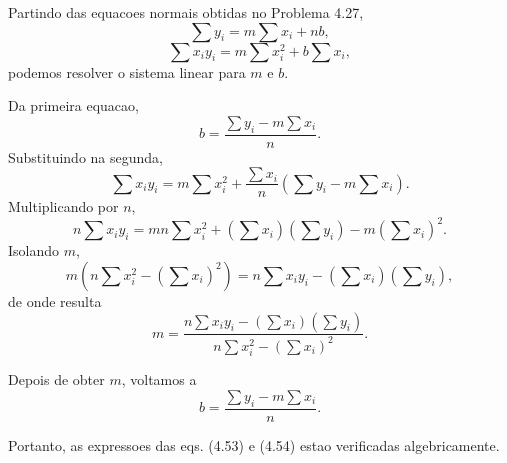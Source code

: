 Partindo das equacoes normais obtidas no Problema 4.27,
\[
\sum y_i=m\sum x_i+nb,
\]
\[
\sum x_i y_i=m\sum x_i^2+b\sum x_i,
\]
podemos resolver o sistema linear para $m$ e $b$.

Da primeira equacao,
\[
b=\frac{\sum y_i-m\sum x_i}{n}.
\]
Substituindo na segunda,
\[
\sum x_i y_i=m\sum x_i^2+\frac{\sum x_i}{n}(\sum y_i-m\sum x_i).
\]
Multiplicando por $n$,
\[
n\sum x_i y_i=mn\sum x_i^2+(\sum x_i)(\sum y_i)-m(\sum x_i)^2.
\]
Isolando $m$,
\[
m\left(n\sum x_i^2-(\sum x_i)^2\right)=n\sum x_i y_i-(\sum x_i)(\sum y_i),
\]
de onde resulta
\[
m=\frac{n\sum x_i y_i-(\sum x_i)(\sum y_i)}{n\sum x_i^2-(\sum x_i)^2}.
\]

Depois de obter $m$, voltamos a
\[
b=\frac{\sum y_i-m\sum x_i}{n}.
\]

Portanto, as expressoes das eqs. (4.53) e (4.54) estao verificadas algebricamente.